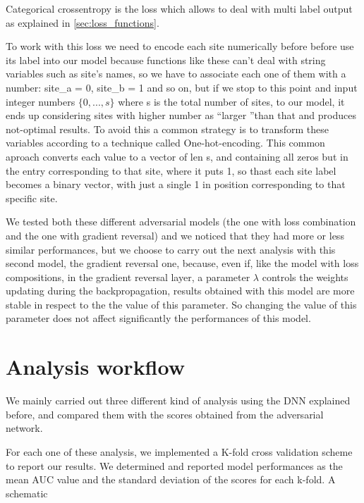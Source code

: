 \documentclass[11pt]{report}
\begin{document}
Categorical crossentropy is the loss which allows to deal with multi label output as explained in \ref{sec:loss_functions}.
\begin{notes}
\item To work with this loss we need to encode each site numerically before before use its label into our model because functions like these can't deal with string variables such as site's names, so we have to associate each one of them with a number: site\_a = 0, site\_b = 1 and so on, but if we stop to this point and input integer numbers $\{0, ..., s\}$ where s is the total number of sites, to our model, it ends up considering sites with higher number as \textquotedblleft larger \textquotedblright than that and produces not-optimal results.
To avoid this a common strategy is to transform these variables according to a technique called One-hot-encoding.
This common aproach converts each value to a vector of len s, and containing all zeros but in the entry corresponding to that site, where it puts 1, so thast each site label becomes a binary vector, with just a single 1 in position corresponding to that specific site.
\end{notes}

We tested both these different adversarial models (the one with loss combination and the one with gradient reversal) and we noticed that they had more or less similar performances, but we choose to carry out the next analysis with this second model, the gradient reversal one, because, even if, like the model with loss compositions, in the gradient reversal layer, a parameter $\lambda$ controls the weights updating during the backpropagation,
results obtained with this model are more stable in respect to the the value of this parameter.
So changing the value of this parameter does not affect significantly the performances of this model.

\newpage

\section{Analysis workflow}

We mainly carried out three different kind of analysis using the DNN explained before, and compared them with the scores obtained from the adversarial network.

For each one of these analysis, we implemented a K-fold cross validation scheme to report our results. We determined and reported model performances as the mean AUC value and the standard deviation of the scores for each k-fold. A schematic
\end{document}
